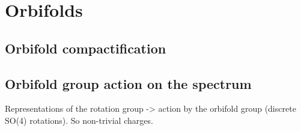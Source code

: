 

\chapter{Orbifolds}
\label{chap:orbifold}
\pagestyle{fancy}

\section{Orbifold compactification}

\section{Orbifold group action on the spectrum}

Representations of the rotation group -> action by the orbifold group (discrete SO(4) rotations). So non-trivial charges.